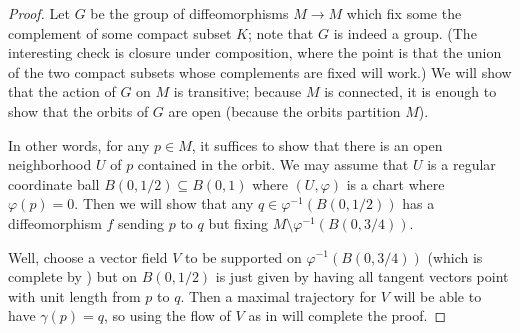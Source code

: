 \documentclass[../notes.tex]{subfiles}
\begin{document}
\begin{proof}
	Let $G$ be the group of diffeomorphisms $M\to M$ which fix some the complement of some compact subset $K$; note that $G$ is indeed a group. (The interesting check is closure under composition, where the point is that the union of the two compact subsets whose complements are fixed will work.) We will show that the action of $G$ on $M$ is transitive; because $M$ is connected, it is enough to show that the orbits of $G$ are open (because the orbits partition $M$).

	In other words, for any $p\in M$, it suffices to show that there is an open neighborhood $U$ of $p$ contained in the orbit. We may assume that $U$ is a regular coordinate ball $B(0,1/2)\subseteq B(0,1)$ where $(U,\varphi)$ is a chart where $\varphi(p)=0$. Then we will show that any $q\in\varphi^{-1}(B(0,1/2))$ has a diffeomorphism $f$ sending $p$ to $q$ but fixing $M\setminus\varphi^{-1}(B(0,3/4))$.

	Well, choose a vector field $V$ to be supported on $\varphi^{-1}(B(0,3/4))$ (which is complete by ) but on $B(0,1/2)$ is just given by having all tangent vectors point with unit length from $p$ to $q$. Then a maximal trajectory for $V$ will be able to have $\gamma(p)=q$, so using the flow of $V$ as in  will complete the proof.
\end{proof}
\end{document}
